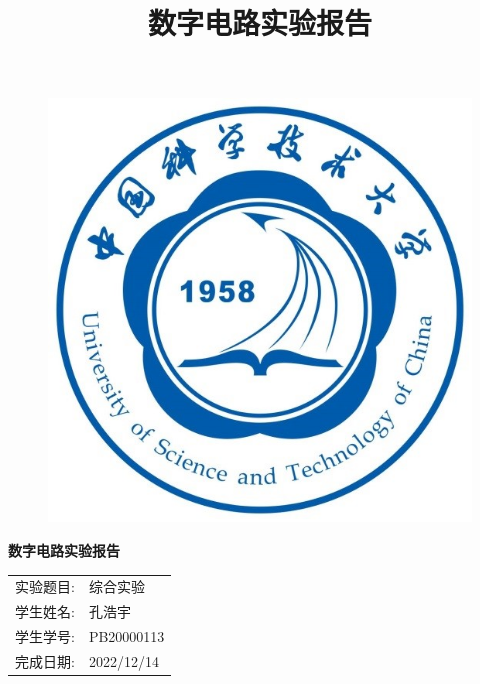 \documentclass{article}
\title{\heiti 数字电路实验报告 }
\begin{document}
	\vspace*{1cm}
	
	\begin{figure}[h]
		\centering
		\includegraphics[scale=1.0]{xh.jpg}
	\end{figure}

	\vspace*{0.5cm}
	
	\begin{center}
		\Huge{\textbf{数字电路实验报告}}
	\end{center}
	
	\vspace{5cm}
	
	\begin{table}[h]
		\centering
		\begin{Large}
			\begin{tabular}{p{3cm} p{7cm}<{\centering}}
				实验题目: &   综合实验     \\ \cline{2-2}
				学生姓名:      & 孔浩宇   \\ \cline{2-2}
				学生学号: & PB20000113 \\ \cline{2-2}
				完成日期:       & 2022/12/14 \\ \cline{2-2}
			\end{tabular}
		\end{Large}		
	\end{table}
	\newpage
\end{document}
